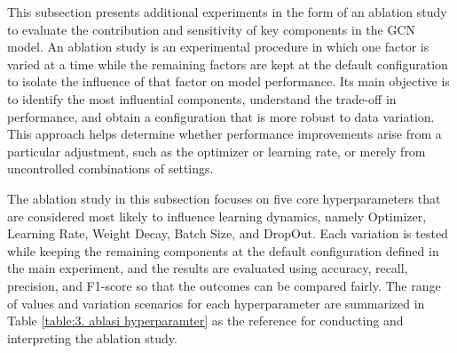 \documentclass[10pt,TimesNewRoman,a4paper]{matrikenglish}
\begin{document}
This subsection presents additional experiments in the form of an ablation study to evaluate the contribution and sensitivity of key components in the GCN model. An ablation study is an experimental procedure in which one factor is varied at a time while the remaining factors are kept at the default configuration to isolate the influence of that factor on model performance. Its main objective is to identify the most influential components, understand the trade-off in performance, and obtain a configuration that is more robust to data variation. This approach helps determine whether performance improvements arise from a particular adjustment, such as the optimizer or learning rate, or merely from uncontrolled combinations of settings. \par

The ablation study in this subsection focuses on five core hyperparameters that are considered most likely to influence learning dynamics, namely Optimizer, Learning Rate, Weight Decay, Batch Size, and DropOut. Each variation is tested while keeping the remaining components at the default configuration defined in the main experiment, and the results are evaluated using accuracy, recall, precision, and F1-score so that the outcomes can be compared fairly. The range of values and variation scenarios for each hyperparameter are summarized in Table \ref{table:3. ablasi hyperparamter} as the reference for conducting and interpreting the ablation study. \par
\end{document}
